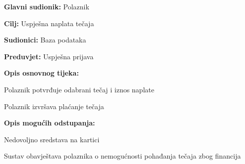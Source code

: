 				\noindent {}
				\begin{packed_item}
					
					\item \textbf{Glavni sudionik:} Polaznik
					\item  \textbf{Cilj:} Uspješna naplata tečaja
					\item  \textbf{Sudionici:} Baza podataka
					\item  \textbf{Preduvjet:} Uspješna prijava
					\item  \textbf{Opis osnovnog tijeka:}
					
					\item[] \begin{packed_enum}
						
						\item Polaznik potvrđuje odabrani tečaj i iznos naplate
						\item Polaznik izvršava plaćanje tečaja
						
					\end{packed_enum}
					
					\item  \textbf{Opis mogućih odstupanja:}
					
					\item[] \begin{packed_item}
						
						\item[2.a] Nedovoljno sredstava na kartici
						\item[] \begin{packed_enum}
							
							\item Sustav obavještava polaznika o nemogućnosti pohađanja tečaja zbog financija
							
						\end{packed_enum}
						
					\end{packed_item}
				\end{packed_item}
			
